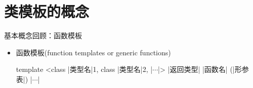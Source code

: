\section[概念]{类模板的概念}\label{sec:chap07-sec01}

\begin{frame}[t, fragile]{基本概念}{回顾：函数模板}%
  \begin{itemize}
  \item 函数模板(function templates or generic functions)\\
    \begin{center}
      \begin{minipage}[t]{0.6\linewidth}
        \begin{cppttnobg}
template <class |类型名|1, class |类型名|2, |$\cdots$|>
|返回类型| |函数名| (|形参表|)
{
  |$\cdots$|
}
        \end{cppttnobg}
      \end{minipage}
    \end{center} 
  \end{itemize}
\end{frame}


